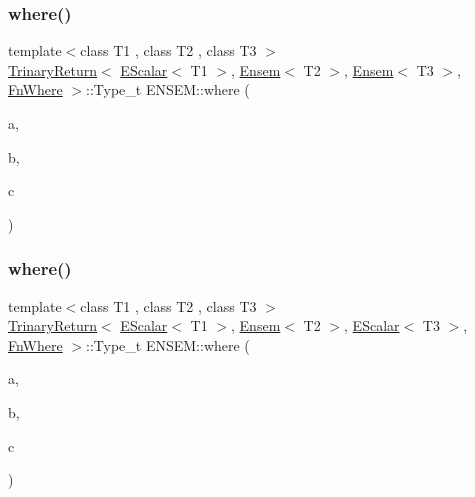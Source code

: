 \mbox{\label{group__eensem_ga25b89d44a0521a8e9be1de7b1e8010b8}} 
\subsubsection{\texorpdfstring{where()}{where()}\hspace{0.1cm}{\footnotesize\ttfamily [5/7]}}
{\footnotesize\ttfamily template$<$class T1 , class T2 , class T3 $>$ \\
\mbox{\hyperlink{structENSEM_1_1TrinaryReturn}{Trinary\+Return}}$<$ \mbox{\hyperlink{classENSEM_1_1EScalar}{E\+Scalar}}$<$ T1 $>$, \mbox{\hyperlink{classENSEM_1_1Ensem}{Ensem}}$<$ T2 $>$, \mbox{\hyperlink{classENSEM_1_1Ensem}{Ensem}}$<$ T3 $>$, \mbox{\hyperlink{structENSEM_1_1FnWhere}{Fn\+Where}} $>$\+::Type\+\_\+t E\+N\+S\+E\+M\+::where (\begin{DoxyParamCaption}\item[{const \mbox{\hyperlink{classENSEM_1_1EScalar}{E\+Scalar}}$<$ T1 $>$ \&}]{a,  }\item[{const \mbox{\hyperlink{classENSEM_1_1Ensem}{Ensem}}$<$ T2 $>$ \&}]{b,  }\item[{const \mbox{\hyperlink{classENSEM_1_1Ensem}{Ensem}}$<$ T3 $>$ \&}]{c }\end{DoxyParamCaption})\hspace{0.3cm}{\ttfamily [inline]}}

\mbox{\label{group__eensem_gaa4e0f13f6f2d07520289a95c6290a38b}} 
\subsubsection{\texorpdfstring{where()}{where()}\hspace{0.1cm}{\footnotesize\ttfamily [6/7]}}
{\footnotesize\ttfamily template$<$class T1 , class T2 , class T3 $>$ \\
\mbox{\hyperlink{structENSEM_1_1TrinaryReturn}{Trinary\+Return}}$<$ \mbox{\hyperlink{classENSEM_1_1EScalar}{E\+Scalar}}$<$ T1 $>$, \mbox{\hyperlink{classENSEM_1_1Ensem}{Ensem}}$<$ T2 $>$, \mbox{\hyperlink{classENSEM_1_1EScalar}{E\+Scalar}}$<$ T3 $>$, \mbox{\hyperlink{structENSEM_1_1FnWhere}{Fn\+Where}} $>$\+::Type\+\_\+t E\+N\+S\+E\+M\+::where (\begin{DoxyParamCaption}\item[{const \mbox{\hyperlink{classENSEM_1_1EScalar}{E\+Scalar}}$<$ T1 $>$ \&}]{a,  }\item[{const \mbox{\hyperlink{classENSEM_1_1Ensem}{Ensem}}$<$ T2 $>$ \&}]{b,  }\item[{const \mbox{\hyperlink{classENSEM_1_1EScalar}{E\+Scalar}}$<$ T3 $>$ \&}]{c }\end{DoxyParamCaption})\hspace{0.3cm}{\ttfamily [inline]}}

